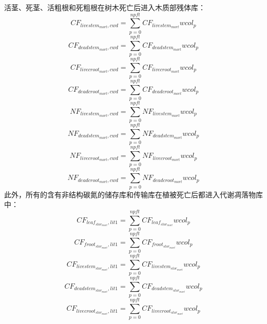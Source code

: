 活茎、死茎、活粗根和死粗根在树木死亡后进入木质部残体库：
\begin{equation}
  CF_{livestem_{mort},cwd}=\sum_{p=0}^{npft}{CF_{livestem_{mort}}{wcol_p}}
\end{equation}
\begin{equation}
  CF_{deadstem_{mort},cwd}=\sum_{p=0}^{npft}{CF_{deadstem_{mort}}{wcol_p}}
\end{equation}
\begin{equation}
  CF_{livecroot_{mort},cwd}=\sum_{p=0}^{npft}{CF_{livecroot_{mort}}{wcol_p}}
\end{equation}
\begin{equation}
  CF_{deadcroot_{mort},cwd}=\sum_{p=0}^{npft}{CF_{deadcroot_{mort}}{wcol_p}}
\end{equation}
\begin{equation}
  NF_{livestem_{mort},cwd}=\sum_{p=0}^{npft}{NF_{livestem_{mort}}{wcol_p}}
\end{equation}
\begin{equation}
  NF_{deadstem_{mort},cwd}=\sum_{p=0}^{npft}{NF_{deadstem_{mort}}{wcol_p}}
\end{equation}
\begin{equation}
  NF_{livecroot_{mort},cwd}=\sum_{p=0}^{npft}{NF_{livecroot_{mort}}{wcol_p}}
\end{equation}
\begin{equation}
  NF_{deadcroot_{mort},cwd}=\sum_{p=0}^{npft}{NF_{deadcroot_{mort}}{wcol_p}}
\end{equation}
此外，所有的含有非结构碳氮的储存库和传输库在植被死亡后都进入代谢凋落物库中：
\begin{equation}
  CF_{leaf_{{stor}_{mort}},lit1}=\sum_{p=0}^{npft}{CF_{leaf_{{stor}_{mort}}}{wcol_p}}
\end{equation}
\begin{equation}
  CF_{froot_{{stor}_{mort}},lit1}=\sum_{p=0}^{npft}{CF_{froot_{{stor}_{mort}}}{wcol_p}}
\end{equation}
\begin{equation}
  CF_{livestem_{{stor}_{mort}},lit1}=\sum_{p=0}^{npft}{CF_{livestem_{{stor}_{mort}}}{wcol_p}}
\end{equation}
\begin{equation}
  CF_{deadstem_{{stor}_{mort}},lit1}=\sum_{p=0}^{npft}{CF_{deadstem_{{stor}_{mort}}}{wcol_p}}
\end{equation}
\begin{equation}
  CF_{livecroot_{{stor}_{mort}},lit1}=\sum_{p=0}^{npft}{CF_{livecroot_{{stor}_{mort}}}{wcol_p}}
\end{equation}
